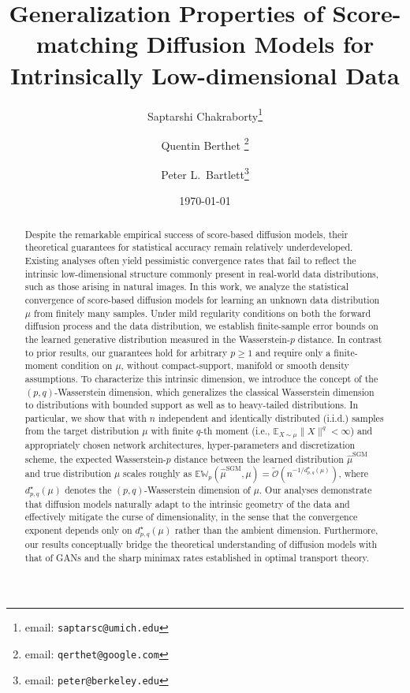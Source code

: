 \documentclass[12pts]{article}
\title{Generalization Properties of Score-matching Diffusion Models for Intrinsically Low-dimensional Data}
\author[1]{Saptarshi Chakraborty\thanks{email: \texttt{saptarsc@umich.edu}}}
\author[4]{Quentin Berthet \thanks{email: \texttt{qerthet@google.com}}}
\author[2,3,4]{Peter L.~Bartlett\thanks{email: \texttt{peter@berkeley.edu}}}
\affil[1]{Department of Statistics, University of Michigan}
\affil[2]{Department of Statistics, University of California, Berkeley}
\affil[3]{Department of Electrical Engineering and Computer Sciences, UC Berkeley}
\affil[4]{Google DeepMind}
\date{\vspace{-5ex}}
\date{\today}
\date{\vspace{-5ex}}
\newcommand{\E}{\mathbb{E}}
\newcommand{\fW}{\mathbb{W}}
\begin{document}
\maketitle
\begin{abstract}
Despite the remarkable empirical success of score-based diffusion models, their theoretical guarantees for statistical accuracy remain relatively underdeveloped. Existing analyses often yield pessimistic convergence rates that fail to reflect the intrinsic low-dimensional structure commonly present in real-world data distributions, such as those arising in natural images. In this work, we analyze the statistical convergence of score-based diffusion models for learning an unknown data distribution $\mu$ from finitely many samples. Under mild regularity conditions on both the forward diffusion process and the data distribution, we establish finite-sample error bounds on the learned generative distribution measured in the Wasserstein-$p$ distance. In contrast to prior results, our guarantees hold for arbitrary $p \ge 1$ and require only a finite-moment condition on $\mu$, without compact-support, manifold or smooth density assumptions. To characterize this intrinsic dimension, we introduce the concept of the  $(p,q)$-Wasserstein dimension, which generalizes the classical Wasserstein dimension to distributions with bounded support as well as to heavy-tailed distributions.  In particular, we show that with $n$ independent and identically distributed (i.i.d.) samples from the target distribution $\mu$ with finite $q$-th moment (i.e., $\E_{X \sim \mu}\|X\|^q < \infty$) and appropriately chosen network architectures, hyper-parameters and discretization scheme, the expected Wasserstein-$p$ distance between the learned distribution $\hat{\mu}^{\text{SGM}}$ and true distribution $\mu$ scales roughly as $\E \fW_p \left(\hat{\mu}^{\text{SGM}}, \mu\right) = \widetilde{\mathcal{O}}\left(n^{-1/d^\star_{p,q}(\mu)}\right)$, where $d^\star_{p,q}(\mu)$ denotes the $(p, q)$-Wasserstein dimension of $\mu$. Our analyses demonstrate that diffusion models naturally adapt to the intrinsic geometry of the data and effectively mitigate the curse of dimensionality, in the sense that the convergence exponent depends only on $d^\star_{p,q}(\mu)$ rather than the ambient dimension. Furthermore, our results conceptually bridge the theoretical understanding of diffusion models with that of GANs and the sharp minimax rates established in optimal transport theory.
\end{abstract}
\end{document}
